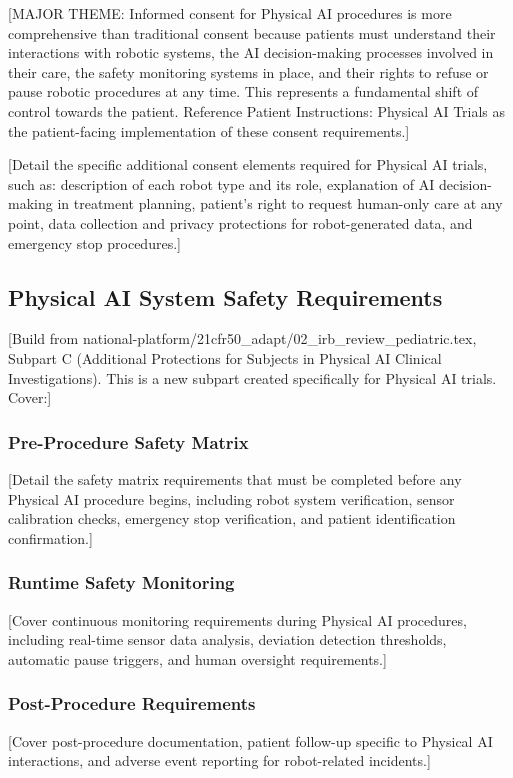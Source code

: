 [MAJOR THEME: Informed consent for Physical AI procedures is more comprehensive
than traditional consent because patients must understand their interactions
with robotic systems, the AI decision-making processes involved in their care,
the safety monitoring systems in place, and their rights to refuse or pause
robotic procedures at any time. This represents a fundamental shift of control
towards the patient. Reference Patient Instructions: Physical AI Trials
\cite{patient-instructions-paper} as the patient-facing implementation of these
consent requirements.]

[Detail the specific additional consent elements required for Physical AI trials,
such as: description of each robot type and its role, explanation of AI
decision-making in treatment planning, patient's right to request human-only
care at any point, data collection and privacy protections for robot-generated
data, and emergency stop procedures.]

\subsection{Physical AI System Safety Requirements}
\label{subsec:cfr50-safety}

[Build from national-platform/21cfr50\_adapt/02\_irb\_review\_pediatric.tex,
Subpart C (Additional Protections for Subjects in Physical AI Clinical
Investigations). This is a new subpart created specifically for Physical AI
trials. Cover:]

\subsubsection{Pre-Procedure Safety Matrix}
[Detail the safety matrix requirements that must be completed before any
Physical AI procedure begins, including robot system verification, sensor
calibration checks, emergency stop verification, and patient identification
confirmation.]

\subsubsection{Runtime Safety Monitoring}
[Cover continuous monitoring requirements during Physical AI procedures,
including real-time sensor data analysis, deviation detection thresholds,
automatic pause triggers, and human oversight requirements.]

\subsubsection{Post-Procedure Requirements}
[Cover post-procedure documentation, patient follow-up specific to Physical AI
interactions, and adverse event reporting for robot-related incidents.]

